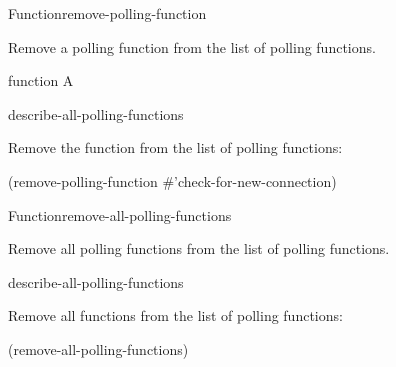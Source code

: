 \documentclass[10pt,twoside,english,pdftex]{article}
\begin{document}

\begin{functiondoc}{Function}{remove-polling-function}{}
%

\fnsyntax 

\fnpurpose Remove a polling function from the list of polling functions.

\fnpackage {}

\fnmodule {}

\fnargs
\begin{args}{function}
\arg[function] A 
\end{args}

\begin{alsos}{describe-all-polling-functions}
\end{alsos}

\fnexample
Remove the function  from the list of polling 
functions:
\begin{example}
  (remove-polling-function #'check-for-new-connection)
\end{example}

\end{functiondoc}


\begin{functiondoc}{Function}{remove-all-polling-functions}{\noargs}
%

\fnsyntax 

\fnpurpose Remove all polling functions from the list of polling functions.

\fnpackage {}

\fnmodule {}

\begin{alsos}{describe-all-polling-functions}
\end{alsos}

\fnexample
Remove all functions from the list of polling functions:
\begin{example}
  (remove-all-polling-functions)
\end{example}

\end{functiondoc}
\end{document}

